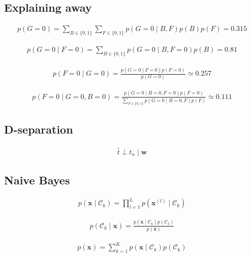 \documentclass{article}
\begin{document}
\subsection{Explaining away}

\begin{align*}
p(G=0)=\sum_{B \in\{0,1\}} \sum_{F \in\{0,1\}} p(G=0 \mid B, F) p(B) p(F)=0.315 
\tag{11.32}
\end{align*}

\begin{align*}
p(G=0 \mid F=0)=\sum_{B \in\{0,1\}} p(G=0 \mid B, F=0) p(B)=0.81 
\tag{11.33}
\end{align*}

\begin{align*}
p(F=0 \mid G=0)=\frac{p(G=0 \mid F=0) p(F=0)}{p(G=0)} \simeq 0.257 
\tag{11.34}
\end{align*}

\begin{align*}
p(F=0 \mid G=0, B=0)=\frac{p(G=0 \mid B=0, F=0) p(F=0)}{\sum_{F \in\{0,1\}} p(G=0 \mid B=0, F) p(F)} \simeq 0.111 
\tag{11.35}
\end{align*}

\subsection{D-separation}

\begin{align*}
\hat{t} \perp t_{n} \mid \mathbf{w} 
\tag{11.36}
\end{align*}

\subsection{Naive Bayes}

\begin{align*}
p\left(\mathbf{x} \mid \mathcal{C}_{k}\right)=\prod_{l=1}^{L} p\left(\mathbf{x}^{(l)} \mid \mathcal{C}_{k}\right) 
\tag{11.37}
\end{align*}

\begin{align*}
p\left(\mathcal{C}_{k} \mid \mathbf{x}\right)=\frac{p\left(\mathbf{x} \mid \mathcal{C}_{k}\right) p\left(\mathcal{C}_{k}\right)}{p(\mathbf{x})} 
\tag{11.38}
\end{align*}

\begin{align*}
p(\mathbf{x})=\sum_{k=1}^{K} p\left(\mathbf{x} \mid \mathcal{C}_{k}\right) p\left(\mathcal{C}_{k}\right) 
\tag{11.39}
\end{align*}
\end{document}

